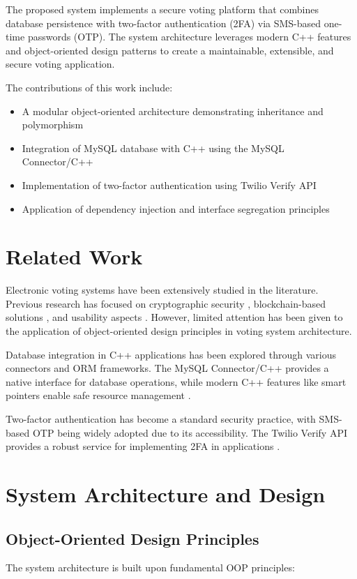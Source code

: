 \documentclass[conference]{IEEEtran}
\begin{document}
The proposed system implements a secure voting platform that combines database persistence with two-factor authentication (2FA) via SMS-based one-time passwords (OTP). The system architecture leverages modern C++ features and object-oriented design patterns to create a maintainable, extensible, and secure voting application.

The contributions of this work include:
\begin{itemize}
    \item A modular object-oriented architecture demonstrating inheritance and polymorphism
    \item Integration of MySQL database with C++ using the MySQL Connector/C++
    \item Implementation of two-factor authentication using Twilio Verify API
    \item Application of dependency injection and interface segregation principles
\end{itemize}

\section{Related Work}
Electronic voting systems have been extensively studied in the literature. Previous research has focused on cryptographic security \cite{ref1}, blockchain-based solutions \cite{ref2}, and usability aspects \cite{ref3}. However, limited attention has been given to the application of object-oriented design principles in voting system architecture.

Database integration in C++ applications has been explored through various connectors and ORM frameworks. The MySQL Connector/C++ provides a native interface for database operations, while modern C++ features like smart pointers enable safe resource management \cite{ref4}.

Two-factor authentication has become a standard security practice, with SMS-based OTP being widely adopted due to its accessibility. The Twilio Verify API provides a robust service for implementing 2FA in applications \cite{ref5}.

\section{System Architecture and Design}

\subsection{Object-Oriented Design Principles}
The system architecture is built upon fundamental OOP principles:
\end{document}
